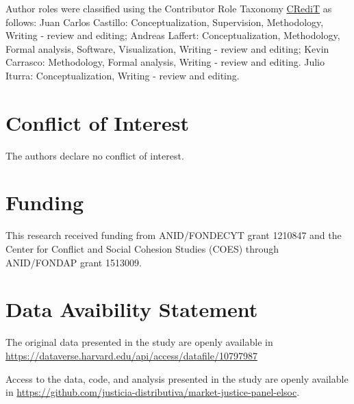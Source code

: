 \documentclass[
  12pt,
]{article}
\begin{document}
Author roles were classified using the Contributor Role Taxonomy
\href{https://credit.niso.org/}{CRediT} as follows: Juan Carlos
Castillo: Conceptualization, Supervision, Methodology, Writing - review
and editing; Andreas Laffert: Conceptualization, Methodology, Formal
analysis, Software, Visualization, Writing - review and editing; Kevin
Carrasco: Methodology, Formal analysis, Writing - review and editing.
Julio Iturra: Conceptualization, Writing - review and editing.

\section{Conflict of Interest}\label{conflict-of-interest}

The authors declare no conflict of interest.

\section{Funding}\label{funding}

This research received funding from ANID/FONDECYT grant 1210847 and the
Center for Conflict and Social Cohesion Studies (COES) through
ANID/FONDAP grant 1513009.

\section{Data Avaibility Statement}\label{data-avaibility-statement}

The original data presented in the study are openly available in
\url{https://dataverse.harvard.edu/api/access/datafile/10797987}

Access to the data, code, and analysis presented in the study are openly
available in
\url{https://github.com/justicia-distributiva/market-justice-panel-elsoc}.
\end{document}
